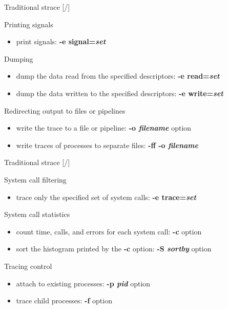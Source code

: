 \documentclass[unicode,aspectratio=169,xcolor={table,dvipsnames,usernames}]{beamer}
\begin{document}
\begin{frame}{Traditional strace \hfill [\insertframenumber/\inserttotalframenumber]}
\large
\begin{block}{Printing signals}
\begin{itemize}
\item print signals: \textbf{-e signal=\textit{set}}
\end{itemize}
\end{block}

\begin{block}{Dumping}
\begin{itemize}
\item dump the data read from the specified descriptors: \textbf{-e read=\textit{set}}
\item dump the data written to the specified descriptors: \textbf{-e write=\textit{set}}
\end{itemize}
\end{block}

\begin{block}{Redirecting output to files or pipelines}
\begin{itemize}
\item write the trace to a file or pipeline: \textbf{-o \textit{filename}} option
\item write traces of processes to separate files: \textbf{-ff -o \textit{filename}}
\end{itemize}
\end{block}
\end{frame}

\begin{frame}{Traditional strace \hfill [\insertframenumber/\inserttotalframenumber]}
\large
\begin{block}{System call filtering}
\begin{itemize}
\item trace only the specified set of system calls: \textbf{-e trace=\textit{set}}
\end{itemize}
\end{block}

\begin{block}{System call statistics}
\begin{itemize}
\item count time, calls, and errors for each system call: \textbf{-c} option
\item sort the histogram printed by the \textbf{-c} option: \textbf{-S \textit{sortby}} option
\end{itemize}
\end{block}

\begin{block}{Tracing control}
\begin{itemize}
\item attach to existing processes: \textbf{-p \textit{pid}} option
\item trace child processes: \textbf{-f} option
\end{itemize}
\end{block}
\end{frame}
\end{document}
